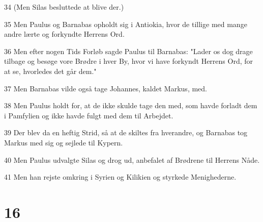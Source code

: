 \par 34 (Men Silas besluttede at blive der.)
\par 35 Men Paulus og Barnabas opholdt sig i Antiokia, hvor de tillige med mange andre lærte og forkyndte Herrens Ord.
\par 36 Men efter nogen Tids Forløb sagde Paulus til Barnabas: "Lader os dog drage tilbage og besøge vore Brødre i hver By, hvor vi have forkyndt Herrens Ord, for at se, hvorledes det går dem."
\par 37 Men Barnabas vilde også tage Johannes, kaldet Markus, med.
\par 38 Men Paulus holdt for, at de ikke skulde tage den med, som havde forladt dem i Pamfylien og ikke havde fulgt med dem til Arbejdet.
\par 39 Der blev da en heftig Strid, så at de skiltes fra hverandre, og Barnabas tog Markus med sig og sejlede til Kypern.
\par 40 Men Paulus udvalgte Silas og drog ud, anbefalet af Brødrene til Herrens Nåde.
\par 41 Men han rejste omkring i Syrien og Kilikien og styrkede Menighederne.

\chapter{16}

